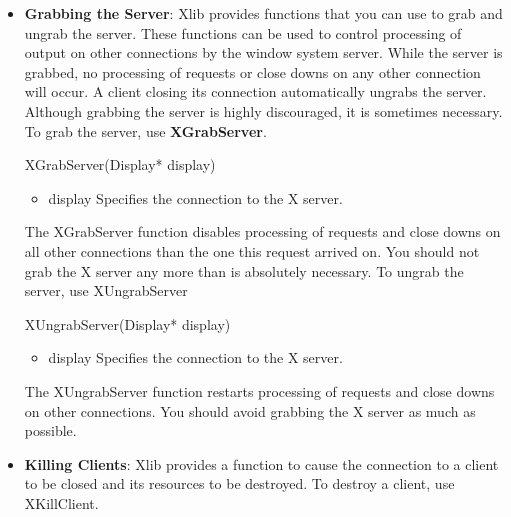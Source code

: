 \documentclass{report}
\begin{document}
\begin{itemize}
\begin{cppcode}
            XFreeFontPath(char** list)
            \end{cppcode}
            \begin{itemize}
                \item list Specifies the array of strings you want to free.
            \end{itemize}
            The XFreeFontPath function frees the data allocated by XGetFontPath
        \item \textbf{Grabbing the Server}: Xlib provides functions that you can use to grab and ungrab the server. These functions can be used to control processing of output on other connections by the window system server. While the server is grabbed, no processing of requests or close downs on any other connection will occur. A client closing its connection automatically ungrabs the server. Although grabbing the server is highly discouraged, it is sometimes necessary.
            \bigbreak \noindent 
            To grab the server, use \textbf{XGrabServer}.
            \bigbreak \noindent 
            \begin{cppcode}
                XGrabServer(Display* display)
            \end{cppcode}
            \begin{itemize}
                \item display Specifies the connection to the X server.
            \end{itemize}
            The XGrabServer function disables processing of requests and close downs on all other connections than the one this request arrived on. You should not grab the X server any more than is absolutely necessary.
            \bigbreak \noindent 
            To ungrab the server, use XUngrabServer
            \bigbreak \noindent 
            \begin{cppcode}
                XUngrabServer(Display* display)
            \end{cppcode}
            \begin{itemize}
                \item display Specifies the connection to the X server.
            \end{itemize}
            The XUngrabServer function restarts processing of requests and close downs on other connections. You should avoid grabbing the X server as much as possible.
        \item \textbf{Killing Clients}: Xlib provides a function to cause the connection to a client to be closed and its resources to be destroyed. To destroy a client, use XKillClient.

\end{itemize}
\end{document}
